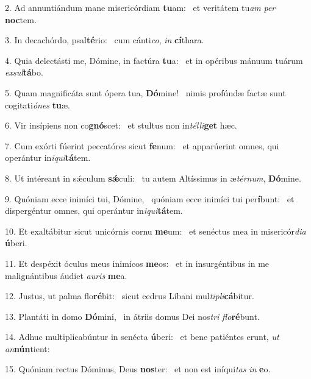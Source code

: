 2. Ad annuntiándum mane misericórdiam \textbf{tu}am: \ast\  et veritátem tu\textit{am} \textit{per} \textbf{noc}tem.\

3. In decachórdo, psal\textbf{té}rio: \ast\  cum cánti\textit{co}, \textit{in} \textbf{cí}thara.\

4. Quia delectásti me, Dómine, in factúra \textbf{tu}a: \ast\  et in opéribus mánuum tuárum \textit{ex}\textit{sul}\textbf{tá}bo.\

5. Quam magnificáta sunt ópera tua, \textbf{Dó}mine! \ast\  nimis profúndæ factæ sunt cogitati\textit{ó}\textit{nes} \textbf{tu}æ.\

6. Vir insípiens non co\textbf{gnó}scet: \ast\  et stultus non in\textit{tél}\textit{li}\textbf{get} hæc.\

7. Cum exórti fúerint peccatóres sicut \textbf{fe}num: \ast\  et apparúerint omnes, qui operántur in\textit{i}\textit{qui}\textbf{tá}tem.\

8. Ut intéreant in sǽculum \textbf{sǽ}culi: \ast\  tu autem Altíssimus in æ\textit{tér}\textit{num}, \textbf{Dó}mine.\

9. Quóniam ecce inimíci tui, Dómine, \dag\  quóniam ecce inimíci tui per\textbf{í}bunt: \ast\  et dispergéntur omnes, qui operántur in\textit{i}\textit{qui}\textbf{tá}tem.\

10. Et exaltábitur sicut unicórnis cornu \textbf{me}um: \ast\  et senéctus mea in misericór\textit{di}\textit{a} \textbf{ú}beri.\

11. Et despéxit óculus meus inimícos \textbf{me}os: \ast\  et in insurgéntibus in me malignántibus áudiet \textit{au}\textit{ris} \textbf{me}a.\

12. Justus, ut palma flo\textbf{ré}bit: \ast\  sicut cedrus Líbani mul\textit{ti}\textit{pli}\textbf{cá}bitur.\

13. Plantáti in domo \textbf{Dó}mini, \ast\  in átriis domus Dei nos\textit{tri} \textit{flo}\textbf{ré}bunt.\

14. Adhuc multiplicabúntur in senécta \textbf{ú}beri: \ast\  et bene patiéntes erunt, \textit{ut} \textit{an}\textbf{nún}tient:\

15. Quóniam rectus Dóminus, Deus \textbf{nos}ter: \ast\  et non est iníqui\textit{tas} \textit{in} \textbf{e}o.\

